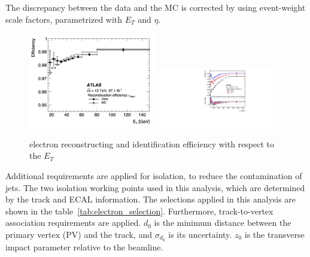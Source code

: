 The discrepancy between the data and the MC is corrected by using event-weight scale factors, parametrized with $E_T$ and $\eta$.
\begin{figure}[tbp]
\begin{center}
 \includegraphics[width=0.50\textwidth,keepaspectratio]{figures/Reconstruction/recoElectron}
 \includegraphics[width=0.45\textwidth,keepaspectratio]{figures/Reconstruction/idElectron}
\caption{
electron reconstructing and identification efficiency with respect to the $E_T$
}
\label{fig:recoElectron}
\end{center}
\end{figure}
Additional requirements are applied for isolation, to reduce the contamination of jets. 
The two isolation working points used in this analysis, which are determined by the track and ECAL information. 
The selections applied in this analysis are shown in the table~\ref{tab:electron_selection}.
Furthermore, track-to-vertex association requirements are applied. 
$d_0$ is the minimum distance between the primary vertex (PV) and the track, and $\sigma_{d_0}$ is its uncertainty. $z_0$ is the transverse impact parameter relative to the beamline.
